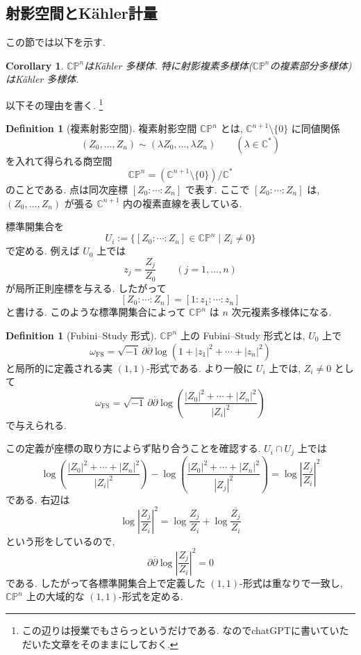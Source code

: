 \documentclass[dvipdfmx,a4paper,11pt]{article} %
\newtheorem{cor}[thm]{Corollary}
\theoremstyle{definition}
\newtheorem{defn}[thm]{Definition}
\theoremstyle{remark}
\numberwithin{equation}{section}
\newcommand{\C}{\mathbb{C}}
\begin{document}
\subsection{射影空間とK\"ahler計量}

この節では以下を示す. 

\begin{cor}
\(\C\mathbb{P}^n\)はK\"ahler 多様体. 
特に射影複素多様体(\(\C\mathbb{P}^n\)の複素部分多様体)はK\"ahler 多様体. 
\end{cor}

以下その理由を書く. \footnote{この辺りは授業でもさらっというだけである. なのでchatGPTに書いていただいた文章をそのままにしておく. }


\begin{defn}[複素射影空間]
複素射影空間 \(\C\mathbb{P}^n\) とは, \(\mathbb{C}^{n+1}\setminus\{0\}\) に同値関係
\[
(Z_0,\ldots,Z_n)\sim (\lambda Z_0,\ldots,\lambda Z_n)\qquad (\lambda\in\mathbb{C}^*)
\]
を入れて得られる商空間
\[
\C\mathbb{P}^n
=
(\mathbb{C}^{n+1}\setminus\{0\})/\mathbb{C}^*
\]
のことである. 点は同次座標
\(
[Z_0:\cdots:Z_n]
\)
で表す. ここで \([Z_0:\cdots:Z_n]\) は, \((Z_0,\ldots,Z_n)\) が張る \(\mathbb{C}^{n+1}\) 内の複素直線を表している.
\end{defn}

標準開集合を
\[
U_i:=\{[Z_0:\cdots:Z_n]\in\C\mathbb{P}^n\mid Z_i\neq 0\}
\]
で定める. 例えば \(U_0\) 上では
\[
z_j=\frac{Z_j}{Z_0}\qquad (j=1,\ldots,n)
\]
が局所正則座標を与える. したがって
\[
[Z_0:\cdots:Z_n]=[1:z_1:\cdots:z_n]
\]
と書ける. このような標準開集合によって \(\C\mathbb{P}^n\) は \(n\) 次元複素多様体になる.

\begin{defn}[Fubini--Study 形式]
\(\C\mathbb{P}^n\) 上の Fubini--Study 形式とは, \(U_0\) 上で
\[
\omega_{\mathrm{FS}}
=
\sqrt{-1}\,\partial\overline{\partial}
\log(1+|z_1|^2+\cdots+|z_n|^2)
\]
と局所的に定義される実 \((1,1)\)-形式である. より一般に \(U_i\) 上では, \(Z_i\neq 0\) として
\[
\omega_{\mathrm{FS}}
=
\sqrt{-1}\,\partial\overline{\partial}
\log\left(
\frac{|Z_0|^2+\cdots+|Z_n|^2}{|Z_i|^2}
\right)
\]
で与えられる.
\end{defn}

この定義が座標の取り方によらず貼り合うことを確認する. \(U_i\cap U_j\) 上では
\[
\log\left(
\frac{|Z_0|^2+\cdots+|Z_n|^2}{|Z_i|^2}
\right)
-
\log\left(
\frac{|Z_0|^2+\cdots+|Z_n|^2}{|Z_j|^2}
\right)
=
\log\left|\frac{Z_j}{Z_i}\right|^2
\]
である. 右辺は
\[
\log\left|\frac{Z_j}{Z_i}\right|^2
=
\log\frac{Z_j}{Z_i}
+
\log\overline{\frac{Z_j}{Z_i}}
\]
という形をしているので,
\[
\partial\overline{\partial}\log\left|\frac{Z_j}{Z_i}\right|^2=0
\]
である. したがって各標準開集合上で定義した \((1,1)\)-形式は重なりで一致し, \(\C\mathbb{P}^n\) 上の大域的な \((1,1)\)-形式を定める.
\end{document}

